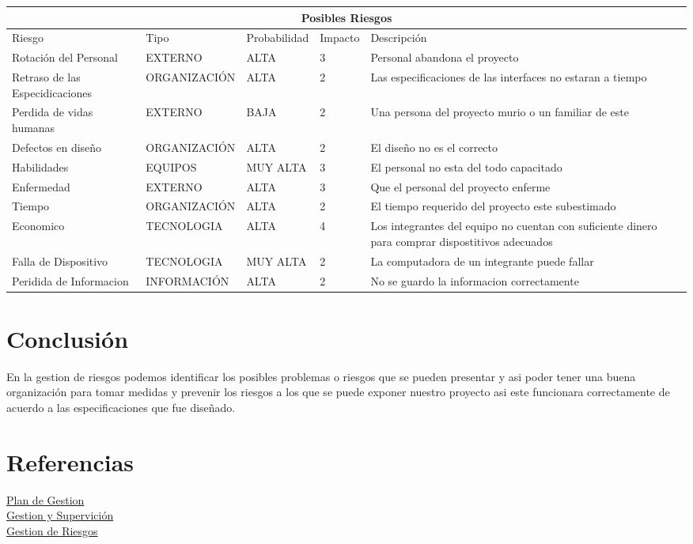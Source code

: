 \documentclass[12pt]{article}
\begin{document}
\begin{tabular}{ |p{2.5cm}||p{3.2cm}|p{2.5cm}|p{1.5cm}||p{3.5cm}|  }
 \hline
 \multicolumn{5}{|c|}{Posibles Riesgos} \\
 \hline
 Riesgo& Tipo & Probabilidad & Impacto & Descripción\\
 \hline
 Rotación del Personal& EXTERNO& ALTA & 3 &Personal abandona el proyecto\\
 Retraso de las Especidicaciones& ORGANIZACIÓN  & ALTA & 2 & Las especificaciones de las interfaces no estaran a tiempo\\
 Perdida de vidas humanas &EXTERNO & BAJA & 2 & Una persona del proyecto murio o un familiar de este\\
 Defectos en diseño & ORGANIZACIÓN &ALTA & 2 & El diseño no es el correcto\\
 Habilidades & EQUIPOS &MUY ALTA & 3 & El personal no esta del todo capacitado\\
 Enfermedad & EXTERNO & ALTA & 3 & Que el personal del proyecto enferme\\
 Tiempo & ORGANIZACIÓN & ALTA & 2 & El tiempo requerido del proyecto este subestimado\\
 Economico &TECNOLOGIA & ALTA & 4 & Los integrantes del equipo no cuentan con suficiente dinero para comprar dispostitivos adecuados\\
 Falla de Dispositivo & TECNOLOGIA & MUY ALTA & 2 & La computadora de un integrante puede fallar\\
 Peridida de Informacion & INFORMACIÓN & ALTA & 2& No se guardo la informacion correctamente\\
 \hline
\end{tabular}

\section{Conclusión}
En la gestion de riesgos podemos identificar los posibles problemas o riesgos que se pueden presentar y asi poder tener una buena organización para tomar medidas y prevenir los riesgos a los que se puede exponer nuestro proyecto asi este funcionara correctamente de acuerdo a las especificaciones que fue diseñado.\\


\section{Referencias}
\href{https://issuu.com/xaviernievez/docs/cuarto_docum_-_plan_de_gestion_de_riesgos}{Plan de Gestion}\\
\href{http://www.lsi.us.es/docencia/get.php?id=7133}{Gestion y Supervición}\\
\href{https://ocw.unican.es/pluginfile.php/1408/course/section/1803/tema7-gestionRiesgos.pdf}{Gestion de Riesgos}\\
\end{document}
